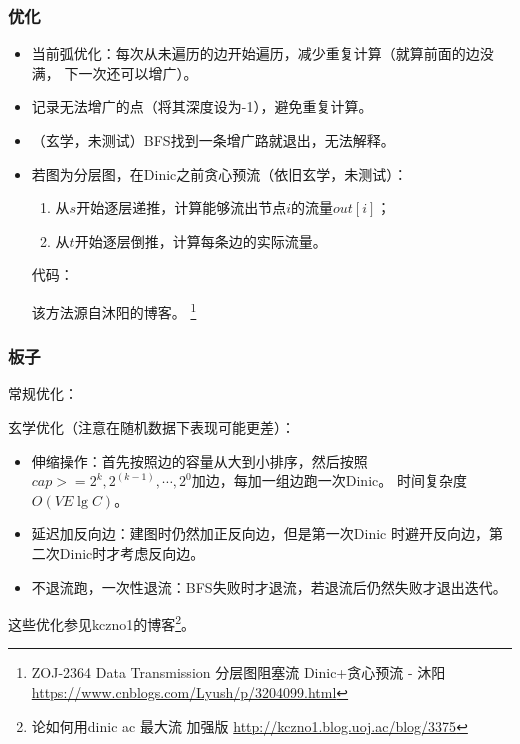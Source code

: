 \subsubsection{优化}
\begin{itemize}
	\item 当前弧优化：每次从未遍历的边开始遍历，减少重复计算（就算前面的边没满，
	      下一次还可以增广）。
	\item 记录无法增广的点（将其深度设为-1），避免重复计算。
	\item （玄学，未测试）BFS找到一条增广路就退出，无法解释。
	\item 若图为分层图，在Dinic之前贪心预流（依旧玄学，未测试）：
	      \begin{enumerate}
		      \item 从$s$开始逐层递推，计算能够流出节点$i$的流量$out[i]$；
		      \item 从$t$开始逐层倒推，计算每条边的实际流量。
	      \end{enumerate}
	      代码：

	      

	      该方法源自沐阳的博客。
	      \footnote{ZOJ-2364 Data Transmission 分层图阻塞流 Dinic+贪心预流 - 沐阳
		      \url{https://www.cnblogs.com/Lyush/p/3204099.html}}
\end{itemize}

\subsubsection{板子}

常规优化：


玄学优化（注意在随机数据下表现可能更差）：

\begin{itemize}
	\item 伸缩操作：首先按照边的容量从大到小排序，然后按照
	$cap>=2^k,2^(k-1),\cdots,2^0$加边，每加一组边跑一次Dinic。
	时间复杂度$O(VE\lg C)$。
	\item 延迟加反向边：建图时仍然加正反向边，但是第一次Dinic
	时避开反向边，第二次Dinic时才考虑反向边。
	\item 不退流跑，一次性退流：BFS失败时才退流，若退流后仍然失败才退出迭代。
\end{itemize}

这些优化参见kczno1的博客\footnote{
	论如何用dinic ac 最大流 加强版
	\url{http://kczno1.blog.uoj.ac/blog/3375}}。

